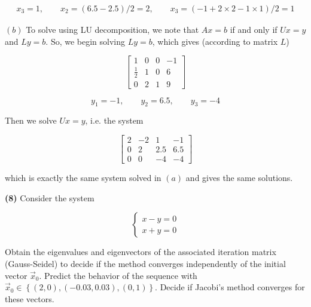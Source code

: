 \documentclass[12pt]{article}
\theoremstyle{definition}
\begin{document}
\begin{align*}
    x_3 = 1, \qquad x_2 = ( 6.5 - 2.5 ) / 2 = 2, \qquad x_3 = (-1 + 2
    \times 2 - 1 \times 1) / 2 = 1
\end{align*}

$(b)$ To solve using LU decomposition, we note that $Ax = b$ if and only if 
$Ux = y$ and $Ly = b$. So, we begin solving $Ly = b$, which gives (according to
matrix $L$)

\begin{equation*}
    \begin{bmatrix} 
        1 & 0 & 0 & -1 \\ 
        \frac{1}{2} & 1 & 0 & 6 \\ 
        0 & 2 & 1 & 9
    \end{bmatrix} 
\end{equation*}

\begin{equation*}
    y_1 = -1, \qquad y_2 = 6.5, \qquad y_3 = -4
\end{equation*}

Then we solve $Ux = y$, i.e. the system 

\begin{equation*}
    \begin{bmatrix} 
        2 & -2 & 1 & -1 \\ 
        0 & 2 & 2.5 & 6.5 \\ 
        0 & 0 & -4 & -4
    \end{bmatrix} 
\end{equation*}

which is exactly the same system solved in $(a)$ and gives the same solutions.

\pagebreak 

\begin{shaded}
    \textbf{(8)} Consider the system 

    \begin{equation*}
        \begin{cases}
            x - y = 0 \\ 
            x + y = 0
        \end{cases}
    \end{equation*}

    Obtain the eigenvalues and eigenvectors of the associated iteration matrix
    (Gauss-Seidel) to decide if the method converges independently of the
    initial vector $\overrightarrow{x}_0$. Predict the behavior of the sequence 
    with $\overrightarrow{x}_0 \in  \left\{ (2, 0), (-0.03, 0.03), (0, 1)
    \right\} $. Decide if Jacobi's method converges for these vectors.
\end{shaded}
\end{document}
